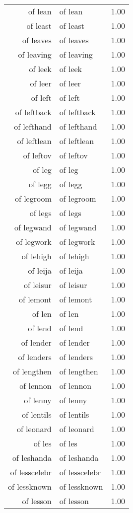 \begin{table}[ht]
\begin{tabular}{rlr}
  of lean & of lean & 1.00 \\ 
  of least & of least & 1.00 \\ 
  of leaves & of leaves & 1.00 \\ 
  of leaving & of leaving & 1.00 \\ 
  of leek & of leek & 1.00 \\ 
  of leer & of leer & 1.00 \\ 
  of left & of left & 1.00 \\ 
  of leftback & of leftback & 1.00 \\ 
  of lefthand & of lefthand & 1.00 \\ 
  of leftlean & of leftlean & 1.00 \\ 
  of leftov & of leftov & 1.00 \\ 
  of leg & of leg & 1.00 \\ 
  of legg & of legg & 1.00 \\ 
  of legroom & of legroom & 1.00 \\ 
  of legs & of legs & 1.00 \\ 
  of legwand & of legwand & 1.00 \\ 
  of legwork & of legwork & 1.00 \\ 
  of lehigh & of lehigh & 1.00 \\ 
  of leija & of leija & 1.00 \\ 
  of leisur & of leisur & 1.00 \\ 
  of lemont & of lemont & 1.00 \\ 
  of len & of len & 1.00 \\ 
  of lend & of lend & 1.00 \\ 
  of lender & of lender & 1.00 \\ 
  of lenders & of lenders & 1.00 \\ 
  of lengthen & of lengthen & 1.00 \\ 
  of lennon & of lennon & 1.00 \\ 
  of lenny & of lenny & 1.00 \\ 
  of lentils & of lentils & 1.00 \\ 
  of leonard & of leonard & 1.00 \\ 
  of les & of les & 1.00 \\ 
  of leshanda & of leshanda & 1.00 \\ 
  of lesscelebr & of lesscelebr & 1.00 \\ 
  of lessknown & of lessknown & 1.00 \\ 
  of lesson & of lesson & 1.00 \\ 

\end{tabular}
\end{table}
